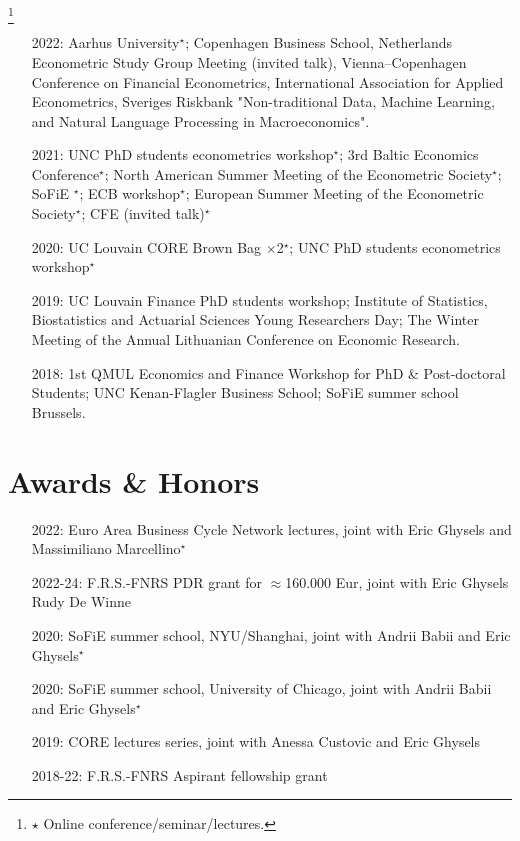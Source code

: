 \documentclass[10pt]{article}
\newcommand\blfootnote[1]{%
	\begingroup
	\renewcommand\thefootnote{}\footnote{#1}%
	\addtocounter{footnote}{-1}%
	\endgroup
}
\newcommand{\thestar}{{\Large{\color{blue}\ensuremath{\star}} }}
\newcommand{\thestarnogap}{{\Large{\color{blue}\ensuremath{^\star}}}}
\begin{document}
	\blfootnote{\thestar Online conference/seminar/lectures.} 
	\begin{itemize}[leftmargin=4.5em]
		\setlength\itemsep{-0.1em}
		\item[2022:] Aarhus University\thestarnogap; Copenhagen Business School, Netherlands Econometric Study Group Meeting (invited talk), Vienna–Copenhagen Conference on Financial Econometrics, International Association for Applied Econometrics, Sveriges Riskbank "Non-traditional Data, Machine Learning, and Natural Language Processing in Macroeconomics".
		\item[2021:] UNC PhD students econometrics workshop\thestarnogap; 3rd Baltic Economics Conference\thestarnogap; North American Summer Meeting of the Econometric Society\thestarnogap; SoFiE \thestarnogap; ECB workshop\thestarnogap; European Summer Meeting of the Econometric Society\thestarnogap; CFE (invited talk)\thestarnogap
		\item[2020:] UC Louvain CORE Brown Bag $\times$2\thestarnogap; UNC PhD students econometrics workshop\thestarnogap
		\item[2019:] UC Louvain Finance PhD students workshop; Institute of Statistics, Biostatistics and Actuarial Sciences Young Researchers Day; The Winter Meeting of the Annual Lithuanian Conference on Economic Research.
		\item[2018:] 1st QMUL Economics and Finance Workshop for PhD \& Post-doctoral Students; UNC Kenan-Flagler Business School; SoFiE summer school Brussels.
	\end{itemize}

	
	\section*{Awards \& Honors}
	\vspace{-0.5em}
	\begin{itemize}[leftmargin=4.5em]
		\setlength\itemsep{-0.1em}
		\item[2022:] Euro Area Business Cycle Network lectures, joint with Eric Ghysels and Massimiliano Marcellino\thestarnogap
		\item[2022-24:] F.R.S.-FNRS PDR grant for $\approx$160.000 Eur, joint with Eric Ghysels Rudy De Winne
		\item[2020:] SoFiE summer school, NYU/Shanghai, joint with Andrii Babii and Eric Ghysels\thestarnogap
		\item[2020:] SoFiE summer school, University of Chicago, joint with Andrii Babii and Eric Ghysels\thestarnogap
		\item[2019:] CORE lectures series, joint with Anessa Custovic and Eric Ghysels
		\item[2018-22:] F.R.S.-FNRS Aspirant fellowship grant
	\end{itemize}
	
\end{document}
